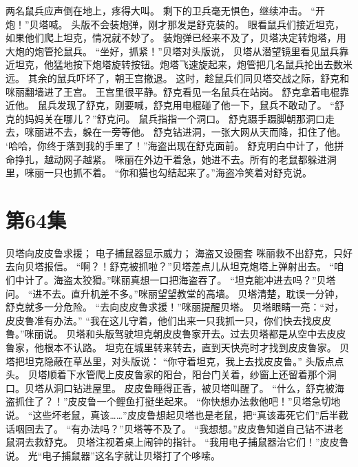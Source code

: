 \documentclass[a4paper,12pt,UTF8,twoside]{ctexbook}
\begin{document}
        两名鼠兵应声倒在地上，疼得大叫。 
        剩下的卫兵毫无惧色，继续冲击。 
        “开炮！”贝塔喊。 
        头版不会装炮弹，刚才那发是舒克装的。 
        眼看鼠兵们接近坦克，如果他们爬上坦克，情况就不妙了。 
        装炮弹已经来不及了，贝塔决定转炮塔，用大炮的炮管抡鼠兵。 
        “坐好，抓紧！”贝塔对头版说， 
        贝塔从潜望镜里看见鼠兵靠近坦克，他猛地按下炮塔旋转按钮。炮塔飞速旋起来，炮管把几名鼠兵抡出去数米远。 
        其余的鼠兵吓坏了，朝王宫撤退。 
        这时，趁鼠兵们同贝塔交战之际，舒克和咪丽翻墙进了王宫。 
        王宫里很平静。舒克看见一名鼠兵在站岗。 
        舒克拿着电棍靠近他。 
        鼠兵发现了舒克，刚要喊，舒克用电棍碰了他一下，鼠兵不敢动了。 
        “舒克的妈妈关在哪儿？”舒克问。 
        鼠兵指指一个洞口。 
        舒克蹑手蹑脚朝那洞口走去，咪丽进不去，躲在一旁等他。 
        舒克钻进洞，一张大网从天而降，扣住了他。 
        ‘哈哈，你终于落到我的手里了！”海盗出现在舒克面前。 
        舒克明白中计了，他拼命挣扎，越动网子越紧。 
        咪丽在外边干着急，她进不去。所有的老鼠都躲进洞里，咪丽一只也抓不着。 
        “你和猫也勾结起来了。”海盗冷笑着对舒克说。   \chapter{第64集} 
        贝塔向皮皮鲁求援； 
        电子捕鼠器显示威力； 
        海盗又设圈套   
        咪丽救不出舒克，只好去向贝塔报信。 
        “啊？！舒克被抓啦？”贝塔差点儿从坦克炮塔上弹射出去。 
        “咱们中计了。海盗太狡猾。”咪丽真想一口把海盗吞了。 
        “坦克能冲进去吗？”贝塔问。 
        “进不去。直升机差不多。”咪丽望望教堂的高墙。 
        贝塔清楚，耽误一分钟，舒克就多一分危险。 
        “去向皮皮鲁求援！”咪丽提醒贝塔。 
        贝塔眼睛一亮：“对，皮皮鲁准有办法。” 
        “我在这儿守着，他们出来一只我抓一只，你们快去找皮皮鲁。”咪丽说。 
        贝塔和头版驾驶坦克朝皮皮鲁家开去。过去贝塔都是从空中去皮皮鲁家，他根本不认路。 
        坦克在城里转来转去，直到天快亮时才找到皮皮鲁家。 
        贝塔把坦克隐蔽在草丛里，对头版说： 
        “你守着坦克，我上去找皮皮鲁。” 
        头版点点头。 
        贝塔顺着下水管爬上皮皮鲁家的阳台，阳台门关着，纱窗上还留着那个洞口。贝塔从洞口钻进屋里。 
        皮皮鲁睡得正香，被贝塔叫醒了。 
        “什么，舒克被海盗抓住了？！”皮皮鲁一个鲤鱼打挺坐起来。 
        “你快想办法救他吧！”贝塔急切地说。 
        “这些坏老鼠，真该……”皮皮鲁想起贝塔也是老鼠，把“真该毒死它们”后半截话咽回去了。 
        “有办法吗？”贝塔等不及了。 
        “我想想。”皮皮鲁知道自己钻不进老鼠洞去救舒克。 
        贝塔注视着桌上闹钟的指针。 
        “我用电子捕鼠器治它们！”皮皮鲁说。 
        光“电子捕鼠器”这名字就让贝塔打了个哆嗦。 
\end{document}
